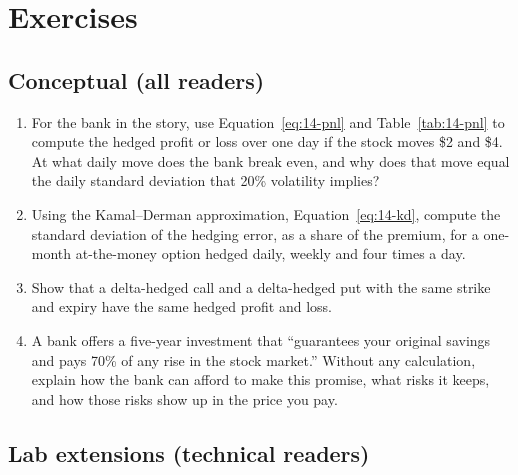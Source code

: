\section*{Exercises}

\subsection*{Conceptual (all readers)}

\begin{enumerate}
  \item For the bank in the story, use Equation~\eqref{eq:14-pnl} and Table~\ref{tab:14-pnl} to compute the hedged profit or loss over one day if the stock moves \$2 and \$4. At what daily move does the bank break even, and why does that move equal the daily standard deviation that 20\% volatility implies?
  \item Using the Kamal--Derman approximation, Equation~\eqref{eq:14-kd}, compute the standard deviation of the hedging error, as a share of the premium, for a one-month at-the-money option hedged daily, weekly and four times a day.
  \item Show that a delta-hedged call and a delta-hedged put with the same strike and expiry have the same hedged profit and loss.
  \item A bank offers a five-year investment that ``guarantees your original savings and pays 70\% of any rise in the stock market.'' Without any calculation, explain how the bank can afford to make this promise, what risks it keeps, and how those risks show up in the price you pay.
\end{enumerate}

\subsection*{Lab extensions (technical readers)}

